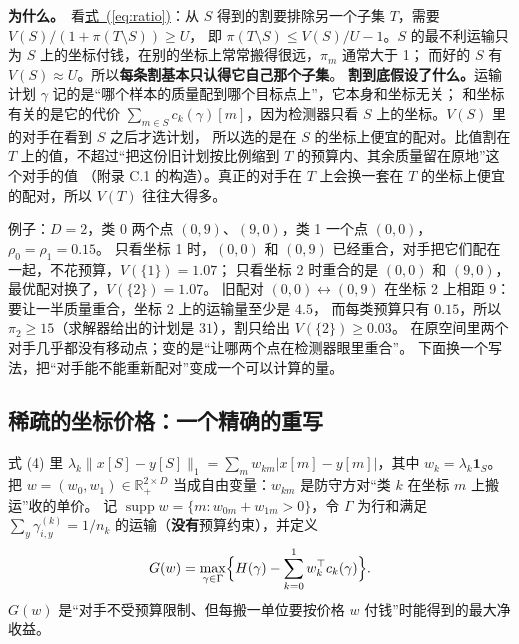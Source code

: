 \documentclass[11pt,a4paper,fontset=none]{ctexart}
\newcommand{\Eqref}[1]{\hyperref[#1]{式~(\ref*{#1})}}
\theoremstyle{definition}
\newcommand{\para}[1]{\par\smallskip\noindent\textbf{#1}\ }
\begin{document}
\para{为什么。}看\Eqref{eq:ratio}：从 $S$ 得到的割要排除另一个子集 $T$，需要 $V(S)/(1+\pi(T\setminus S))\ge U$，
即 $\pi(T\setminus S)\le V(S)/U-1$。$S$ 的最不利运输只为 $S$ 上的坐标付钱，在别的坐标上常常搬得很远，$\pi_m$ 通常大于 1；
而好的 $S$ 有 $V(S)\approx U$。所以\textbf{每条割基本只认得它自己那个子集}。
\textbf{割到底假设了什么。}运输计划 $\gamma$ 记的是“哪个样本的质量配到哪个目标点上”，它本身和坐标无关；
和坐标有关的是它的代价 $\sum_{m\in S}c_k(\gamma)[m]$，因为检测器只看 $S$ 上的坐标。$V(S)$ 里的对手在看到 $S$ 之后才选计划，
所以选的是在 $S$ 的坐标上便宜的配对。比值割在 $T$ 上的值，不超过“把这份旧计划按比例缩到 $T$ 的预算内、其余质量留在原地”这个对手的值
（附录 C.1 的构造）。真正的对手在 $T$ 上会换一套在 $T$ 的坐标上便宜的配对，所以 $V(T)$ 往往大得多。

例子：$D=2$，类 0 两个点 $(0,9)$、$(9,0)$，类 1 一个点 $(0,0)$，$\rho_0=\rho_1=0.15$。
只看坐标 1 时，$(0,0)$ 和 $(0,9)$ 已经重合，对手把它们配在一起，不花预算，$V(\{1\})=1.07$；
只看坐标 2 时重合的是 $(0,0)$ 和 $(9,0)$，最优配对换了，$V(\{2\})=1.07$。
旧配对 $(0,0)\leftrightarrow(0,9)$ 在坐标 2 上相距 9：要让一半质量重合，坐标 2 上的运输量至少是 $4.5$，
而每类预算只有 $0.15$，所以 $\pi_2\ge15$（求解器给出的计划是 $31$），割只给出 $V(\{2\})\ge0.03$。
在原空间里两个对手几乎都没有移动点；变的是“让哪两个点在检测器眼里重合”。
下面换一个写法，把“对手能不能重新配对”变成一个可以计算的量。

\subsection{稀疏的坐标价格：一个精确的重写}\label{sec:prices}
式 (4) 里 $\lambda_k\|x[S]-y[S]\|_1=\sum_mw_{km}|x[m]-y[m]|$，其中 $w_k=\lambda_k\mathbf 1_S$。
把 $w=(w_0,w_1)\in\mathbb R^{2\times D}_+$ 当成自由变量：$w_{km}$ 是防守方对“类 $k$ 在坐标 $m$ 上搬运”收的单价。
记 $\operatorname{supp}w=\{m:w_{0m}+w_{1m}>0\}$，令 $\Gamma$ 为行和满足 $\sum_y\gamma^{(k)}_{i,y}=1/n_k$ 的运输（\textbf{没有}预算约束），并定义
\[
G(w)=\max_{\gamma\in\Gamma}\Bigl\{H(\gamma)-\sum_{k=0}^1w_k^\top c_k(\gamma)\Bigr\}.
\]
$G(w)$ 是“对手不受预算限制、但每搬一单位要按价格 $w$ 付钱”时能得到的最大净收益。
\end{document}
